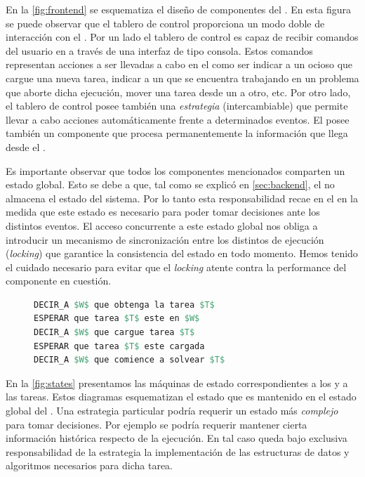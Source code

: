 En la \fig\ref{fig:frontend} se esquematiza el diseño de componentes del
\fend. En esta figura se puede observar que el tablero de control proporciona
un modo doble de interacción con el \bend. Por un lado el tablero de control
es capaz de recibir comandos del usuario en \rt a través de una interfaz de
tipo consola. Estos comandos representan acciones a ser llevadas a cabo en el
\bend como ser indicar a un \w ocioso que cargue una nueva tarea, indicar a un
\w que se encuentra trabajando en un problema que aborte dicha ejecución,
mover una tarea desde un \w a otro, etc. Por otro lado, el tablero de control
posee también una \emph{estrategia} (intercambiable) que permite llevar a cabo
acciones automáticamente frente a determinados eventos. El \fend posee también
un componente que procesa permanentemente la información que llega desde el
\bend. 

Es importante observar que todos los componentes mencionados comparten un
estado global. Esto se debe a que, tal como se explicó en \ref{sec:backend},
el \bend no almacena el estado del sistema. Por lo tanto esta responsabilidad
recae en el \fend en la medida que este estado es necesario para poder tomar
decisiones ante los distintos eventos. El acceso concurrente a este estado
global nos obliga a introducir un mecanismo de sincronización entre los
distintos \threads de ejecución (\emph{locking}) que garantice la consistencia
del estado en todo momento. Hemos tenido el cuidado necesario para evitar que
el \emph{locking} atente contra la performance del componente en cuestión.

\begin{figure}
\vspace{-2em}
\begin{footnotesize}
\begin{lstlisting}[mathescape,language=Pascal,frame=single,label=lst:synchronouscmd,caption=Esquema de comando sincrónico]
DECIR_A $W$ que obtenga la tarea $T$
ESPERAR que tarea $T$ este en $W$
DECIR_A $W$ que cargue tarea $T$
ESPERAR que tarea $T$ este cargada
DECIR_A $W$ que comience a solvear $T$
\end{lstlisting}
\end{footnotesize}
\vspace{-3em}
\end{figure}

En la \fig\ref{fig:states} presentamos las máquinas de estado correspondientes
a los \ws y a las tareas. Estos diagramas esquematizan el estado que es
mantenido en el estado global del \fend. Una estrategia particular podría
requerir un estado más \emph{complejo} para tomar decisiones. Por ejemplo se
podría requerir mantener cierta información histórica respecto de la
ejecución. En tal caso queda bajo exclusiva responsabilidad de la estrategia
la implementación de las estructuras de datos y algoritmos necesarios para
dicha tarea.



